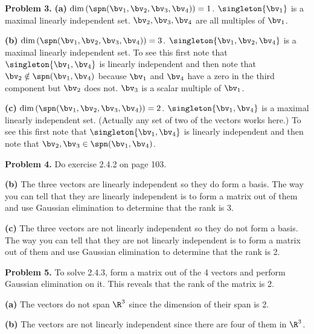 \documentclass[oneside,12pt]{amsart}
\begin{document}
\bigskip

\newpage

\textbf{Problem 3.}
\textbf{(a)} $\dim\left(\spn(\bv_1,\bv_2,\bv_3,\bv_4)\right)=1$.
$\singleton{\bv_1}$ is a maximal linearly independent set. $\bv_2,\bv_3,\bv_4$
are all multiples of $\bv_1$.


\bigskip

\textbf{(b)} $\dim\left(\spn(\bv_1,\bv_2,\bv_3,\bv_4)\right)=3$.
$\singleton{\bv_1,\bv_2,\bv_4}$ is a maximal linearly independent set. To
see this first note that $\singleton{\bv_1,\bv_4}$ is linearly independent
and then note that $\bv_2\notin\spn(\bv_1,\bv_4)$ because $\bv_1$ and $\bv_4$
have a zero in the third component but $\bv_2$ does not. $\bv_3$ is a scalar
multiple of $\bv_1$.

\bigskip

\textbf{(c)} $\dim\left(\spn(\bv_1,\bv_2,\bv_3,\bv_4)\right)=2$.
$\singleton{\bv_1,\bv_4}$ is a maximal linearly independent set. (Actually
any set of two of the vectors works here.) To
see this first note that $\singleton{\bv_1,\bv_4}$ is linearly independent
and then note that $\bv_2,\bv_3\in\spn(\bv_1,\bv_4)$.


\bigskip

\textbf{Problem 4.} Do exercise 2.4.2 on page 103.

\textbf{(b)} The three vectors are linearly independent so they do form a basis.
The way you can tell that they are linearly independent is to form a matrix
out of them and use Gaussian elimination to determine that the rank is 3.

\bigskip

\textbf{(c)} The three vectors are not linearly independent so they do not form
a basis. The way you can tell that they are not linearly independent is to
form a matrix out of them and use Gaussian elimination to determine that the rank is 2.


\bigskip

\textbf{Problem 5.} To solve 2.4.3, form a matrix out of the 4 vectors and
perform Gaussian elimination on it. This reveals that the rank of the matrix
is 2.

\bigskip

\textbf{(a)} The vectors do not span $\R^3$ since the dimension of their span is 2.

\textbf{(b)} The vectors are not linearly independent since  there are four of them in $\R^3$.
\end{document}
